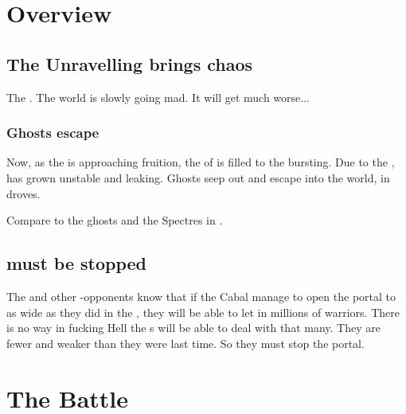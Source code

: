 \begin{garbage}
\section{Overview}









\subsection{The Unravelling brings chaos}
The . 
The world is slowly going mad. 
It will get much worse...





\subsubsection{Ghosts escape}
Now, as the  is approaching fruition, the \carcer{} of \Iquin{} is filled to the bursting. 
Due to the , \Iquin{} has grown unstable and leaking. 
Ghosts seep out and escape into the world, in droves. 

Compare to the ghosts and the Spectres in \cite{PhillipPullman:HisDarkMaterials}. 









\subsection{\Voidbringer{} must be stopped}
The \dragons{} and other \bane-opponents know that if the Cabal manage to open the portal to \Erebos{} as wide as they did in the \secondbanewar, they will be able to let in millions of \bane{} warriors. 
There is no way in fucking Hell the \Miithian s will be able to deal with that many.
They are fewer and weaker than they were last time. 
So they must stop the portal. 















\section{The \Matrices{} Battle}










\end{garbage}
